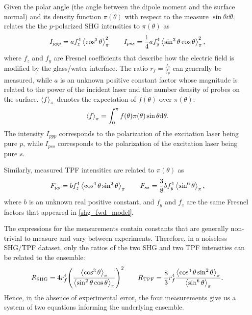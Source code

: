 \documentclass[../../main.tex]{subfiles}
\begin{document}
\begin{refsection}
	Given the polar angle (\ie the angle between the dipole moment and the surface normal) and its density function $\pi(\theta)$ with respect to the measure $\sin\theta \dd{\theta}$, \cite{clancyAngularMappingProtein2019} relates the the $p$-polarized SHG intensities to $\pi(\theta)$ as
	\begin{equation} \label{shg_fwd_model}
		I_{ppp} = a f_z^4 \left\langle \cos^3 \theta \right\rangle_{\pi}^2 \qquad
		I_{pss} = \frac{1}{4} a f_y^4 \left\langle \sin^2 \theta \cos \theta \right\rangle_{\pi}^2,
	\end{equation}
	where $f_z$ and $f_y$ are Fresnel coefficients that describe how the electric field is modified by the glass/water interface.
	The ratio $r_f = \frac{f_z}{f_y}$ can generally be measured, while $a$ is an unknown positive constant factor whose magnitude is related to the power of the incident laser and the number density of probes on the surface.
	$\left\langle f \right\rangle_{\pi}$ denotes the expectation of $f(\theta)$ over $\pi(\theta)$:
	$$\left\langle f \right\rangle_{\pi} = \int_0^\pi f(\theta) \pi(\theta) \sin\theta \dd\theta.$$
	The intensity $I_{ppp}$ corresponds to the polarization of the excitation laser being pure $p$, while $I_{pss}$ corresponds to the polarization of the excitation laser being pure $s$.

	Similarly, measured TPF intensities are related to $\pi(\theta)$ as
	\begin{equation} \label{tpf_fwd_model}
		F_{pp} = b f_z^4 \left\langle \cos^4 \theta \sin^2 \theta \right\rangle_{\pi} \qquad
		F_{ss} = \frac{3}{8} b f_y^4 \left\langle \sin^6 \theta \right\rangle_{\pi},
	\end{equation}
	where $b$ is an unknown real positive constant, and $f_y$ and $f_z$ are the same Fresnel factors that appeared in \cref{shg_fwd_model}.

	The expressions for the measurements contain constants that are generally non-trivial to measure and vary between experiments.
	Therefore, in a noiseless SHG/TPF dataset, only the ratios of the two SHG and two TPF intensities can be related to the ensemble:
	\begin{equation}\label{shg_tpf_ratios}
		R_{\mathrm{SHG}} = 4 r_f^4 \qty(\frac{\left\langle \cos^3\theta \right\rangle_{\pi}}{\left\langle \sin^2\theta \cos\theta \right\rangle_{\pi}})^2 \qquad
		R_{\mathrm{TPF}} = \frac{8}{3} r_f^4 \frac{\left\langle \cos^4\theta \sin^2\theta \right\rangle_{\pi}}{\left\langle \sin^6\theta \right\rangle_{\pi}}.
	\end{equation}
	Hence, in the absence of experimental error, the four measurements give us a system of two equations informing the underlying ensemble.


\end{refsection}
\end{document}
